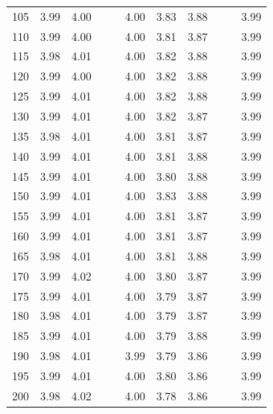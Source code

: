 \documentclass[preprint,12pt]{elsarticle}
\begin{document}
\begin{table}[ht]
\begin{tabular}{c|ccccc|ccccc}
  105 & 3.99 & 4.00 &  &  & 4.00 & 3.83 & 3.88 &  &  & 3.99 \\ 
  110 & 3.99 & 4.00 &  &  & 4.00 & 3.81 & 3.87 &  &  & 3.99 \\ 
  115 & 3.98 & 4.01 &  &  & 4.00 & 3.82 & 3.88 &  &  & 3.99 \\ 
  120 & 3.99 & 4.00 &  &  & 4.00 & 3.82 & 3.88 &  &  & 3.99 \\ 
  125 & 3.99 & 4.01 &  &  & 4.00 & 3.82 & 3.88 &  &  & 3.99 \\ 
  130 & 3.99 & 4.01 &  &  & 4.00 & 3.82 & 3.87 &  &  & 3.99 \\ 
  135 & 3.98 & 4.01 &  &  & 4.00 & 3.81 & 3.87 &  &  & 3.99 \\ 
  140 & 3.99 & 4.01 &  &  & 4.00 & 3.81 & 3.88 &  &  & 3.99 \\ 
  145 & 3.99 & 4.01 &  &  & 4.00 & 3.80 & 3.88 &  &  & 3.99 \\ 
  150 & 3.99 & 4.01 &  &  & 4.00 & 3.83 & 3.88 &  &  & 3.99 \\ 
  155 & 3.99 & 4.01 &  &  & 4.00 & 3.81 & 3.87 &  &  & 3.99 \\ 
  160 & 3.99 & 4.01 &  &  & 4.00 & 3.81 & 3.87 &  &  & 3.99 \\ 
  165 & 3.98 & 4.01 &  &  & 4.00 & 3.81 & 3.88 &  &  & 3.99 \\ 
  170 & 3.99 & 4.02 &  &  & 4.00 & 3.80 & 3.87 &  &  & 3.99 \\ 
  175 & 3.99 & 4.01 &  &  & 4.00 & 3.79 & 3.87 &  &  & 3.99 \\ 
  180 & 3.98 & 4.01 &  &  & 4.00 & 3.79 & 3.87 &  &  & 3.99 \\ 
  185 & 3.99 & 4.01 &  &  & 4.00 & 3.79 & 3.88 &  &  & 3.99 \\ 
  190 & 3.98 & 4.01 &  &  & 3.99 & 3.79 & 3.86 &  &  & 3.99 \\ 
  195 & 3.99 & 4.01 &  &  & 4.00 & 3.80 & 3.86 &  &  & 3.99 \\ 
  200 & 3.98 & 4.02 &  &  & 4.00 & 3.78 & 3.86 &  &  & 3.99 \\ 
   \hline
\end{tabular}
\label{tab:causal2}
\end{table}
\end{document}
